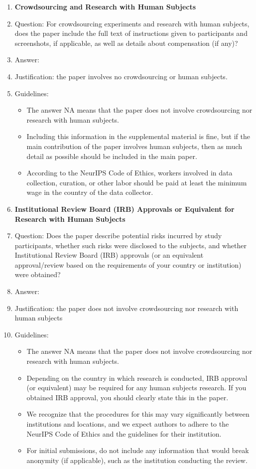 \documentclass{article}
\begin{document}
\begin{enumerate}
\item {\bf Crowdsourcing and Research with Human Subjects}
    \item[] Question: For crowdsourcing experiments and research with human subjects, does the paper include the full text of instructions given to participants and screenshots, if applicable, as well as details about compensation (if any)? 
    \item[] Answer: \answerNA{} %
    \item[] Justification: the paper involves no crowdsourcing or human subjects.
    \item[] Guidelines:
    \begin{itemize}
        \item The answer NA means that the paper does not involve crowdsourcing nor research with human subjects.
        \item Including this information in the supplemental material is fine, but if the main contribution of the paper involves human subjects, then as much detail as possible should be included in the main paper. 
        \item According to the NeurIPS Code of Ethics, workers involved in data collection, curation, or other labor should be paid at least the minimum wage in the country of the data collector. 
    \end{itemize}

\item {\bf Institutional Review Board (IRB) Approvals or Equivalent for Research with Human Subjects}
    \item[] Question: Does the paper describe potential risks incurred by study participants, whether such risks were disclosed to the subjects, and whether Institutional Review Board (IRB) approvals (or an equivalent approval/review based on the requirements of your country or institution) were obtained?
    \item[] Answer: \answerNA{} %
    \item[] Justification: the paper does not involve crowdsourcing nor research with human subjects
    \item[] Guidelines:
    \begin{itemize}
        \item The answer NA means that the paper does not involve crowdsourcing nor research with human subjects.
        \item Depending on the country in which research is conducted, IRB approval (or equivalent) may be required for any human subjects research. If you obtained IRB approval, you should clearly state this in the paper. 
        \item We recognize that the procedures for this may vary significantly between institutions and locations, and we expect authors to adhere to the NeurIPS Code of Ethics and the guidelines for their institution. 
        \item For initial submissions, do not include any information that would break anonymity (if applicable), such as the institution conducting the review.
    \end{itemize}

\end{enumerate}
\end{document}
